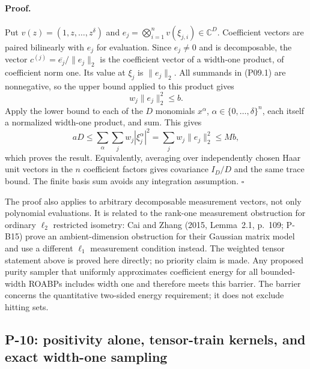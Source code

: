 \paragraph{Proof.}
Put $v(z)=(1,z,\ldots,z^\delta)$ and
$e_j=\bigotimes_{i=1}^n v(\xi_{j,i})\in\mathbb C^D$.
Coefficient vectors are paired bilinearly with $e_j$ for evaluation.
Since $e_j\ne0$ and is decomposable, the vector
$c^{(j)}=\overline{e_j}/\|e_j\|_2$ is the coefficient vector of a width-one product, of coefficient norm one. Its value at $\xi_j$ is $\|e_j\|_2$. All summands in (P09.1) are nonnegative, so the upper bound applied to this product gives
\[
 w_j\|e_j\|_2^2\le b.
\]
Apply the lower bound to each of the $D$ monomials $x^\alpha$, $\alpha\in\{0,\ldots,\delta\}^n$, each itself a normalized width-one product, and sum. This gives
\[
 aD\le\sum_\alpha\sum_j w_j|\xi_j^\alpha|^2
 =\sum_j w_j\|e_j\|_2^2\le Mb,
\]
which proves the result. Equivalently, averaging over independently chosen Haar unit vectors in the $n$ coefficient factors gives covariance $I_D/D$ and the same trace bound. The finite basis sum avoids any integration assumption. $\square$

The proof also applies to arbitrary decomposable measurement vectors, not only polynomial evaluations. It is related to the rank-one measurement obstruction for ordinary $\ell_2$ restricted isometry: Cai and Zhang (2015, Lemma~2.1, p.~109; P-B15) prove an ambient-dimension obstruction for their Gaussian matrix model and use a different $\ell_1$ measurement condition instead. The weighted tensor statement above is proved here directly; no priority claim is made. Any proposed purity sampler that uniformly approximates coefficient energy for all bounded-width ROABPs includes width one and therefore meets this barrier. The barrier concerns the quantitative two-sided energy requirement; it does not exclude hitting sets.

\subsection{P-10: positivity alone, tensor-train kernels, and exact width-one sampling}
